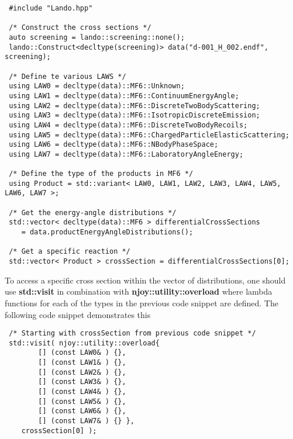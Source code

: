 \documentclass[../main.tex]{subfiles}
\begin{document}
\begin{verbatim}
 #include "Lando.hpp"

 /* Construct the cross sections */
 auto screening = lando::screening::none();
 lando::Construct<decltype(screening)> data("d-001_H_002.endf", screening);
 
 /* Define te various LAWS */
 using LAW0 = decltype(data)::MF6::Unknown;
 using LAW1 = decltype(data)::MF6::ContinuumEnergyAngle;
 using LAW2 = decltype(data)::MF6::DiscreteTwoBodyScattering;
 using LAW3 = decltype(data)::MF6::IsotropicDiscreteEmission;
 using LAW4 = decltype(data)::MF6::DiscreteTwoBodyRecoils;
 using LAW5 = decltype(data)::MF6::ChargedParticleElasticScattering;
 using LAW6 = decltype(data)::MF6::NBodyPhaseSpace;
 using LAW7 = decltype(data)::MF6::LaboratoryAngleEnergy;
 
 /* Define the type of the products in MF6 */
 using Product = std::variant< LAW0, LAW1, LAW2, LAW3, LAW4, LAW5, LAW6, LAW7 >;
 
 /* Get the energy-angle distributions */                  
 std::vector< decltype(data)::MF6 > differentialCrossSections 
    = data.productEnergyAngleDistributions();
    
 /* Get a specific reaction */
 std::vector< Product > crossSection = differentialCrossSections[0];
\end{verbatim}

To access a specific cross section within the vector of distributions, one should use \textbf{std::visit} in combination with \textbf{njoy::utility::overload} where lambda functions for each of the types in the previous code snippet are defined. The following code snippet demonstrates this
\begin{verbatim}
 /* Starting with crossSection from previous code snippet */ 
 std::visit( njoy::utility::overload{ 
        [] (const LAW0& ) {},
        [] (const LAW1& ) {},
        [] (const LAW2& ) {},
        [] (const LAW3& ) {}, 
        [] (const LAW4& ) {},
        [] (const LAW5& ) {}, 
        [] (const LAW6& ) {},
        [] (const LAW7& ) {} },
    crossSection[0] );
\end{verbatim}
\end{document}
